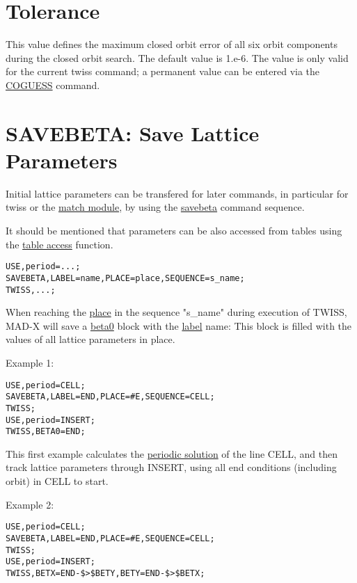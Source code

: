 \section{Tolerance}

This value defines the maximum closed orbit error of all six orbit
components during the closed orbit search. The default value is
1.e-6. The value is only valid for the current twiss command; a
permanent value can be entered via the
\href{../control/general.html#coguess}{COGUESS} command.  

\section{SAVEBETA: Save Lattice Parameters}

Initial lattice parameters can be transfered for later commands, in
particular for twiss or the \href{../match/match.html}{match module}, by
using the \href{../control/general.html#savebeta}{savebeta} command
sequence.  

It should be mentioned that parameters can be also accessed from tables
using the \href{../Introduction/expression.html#table}{table access}
function. 
\begin{verbatim}
USE,period=...;
SAVEBETA,LABEL=name,PLACE=place,SEQUENCE=s_name;
TWISS,...;
\end{verbatim}

When reaching the \href{../control/general.html#place}{place} in the
sequence "s\_name" during execution of TWISS, MAD-X will save a
\hyperlink{beta0}{beta0} block with the
\href{../Introduction/label.html}{label} name: This block is filled with
the values of all lattice parameters in place.  

Example 1: 
\begin{verbatim}
USE,period=CELL;
SAVEBETA,LABEL=END,PLACE=#E,SEQUENCE=CELL;
TWISS;
USE,period=INSERT;
TWISS,BETA0=END;
\end{verbatim}

This first example calculates the \hyperlink{periodic}{periodic
  solution} of the line CELL, and then track lattice parameters through
INSERT, using all end conditions (including orbit) in CELL to start.  

Example 2: 
\begin{verbatim}
USE,period=CELL;
SAVEBETA,LABEL=END,PLACE=#E,SEQUENCE=CELL;
TWISS;
USE,period=INSERT;
TWISS,BETX=END-$>$BETY,BETY=END-$>$BETX;
\end{verbatim}

